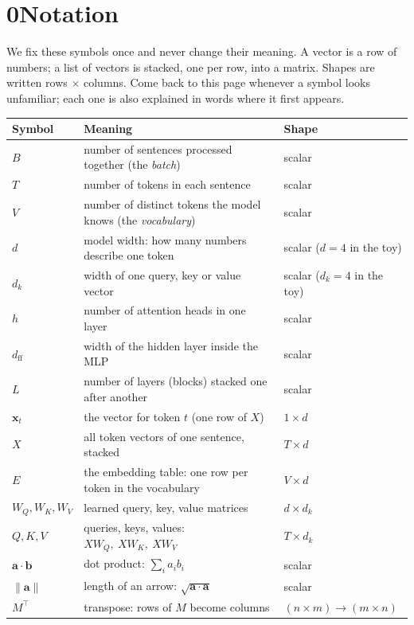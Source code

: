 \section*{0\quad Notation}

We fix these symbols once and never change their meaning. A vector is a row of numbers; a list of
vectors is stacked, one per row, into a matrix. Shapes are written rows $\times$ columns. Come back to this
page whenever a symbol looks unfamiliar; each one is also explained in words where it first appears.

\begin{center}
\small
\begin{longtable}{@{}l P{8.6cm} l@{}}
\toprule
Symbol & Meaning & Shape\\
\midrule
\endhead
$B$ & number of sentences processed together (the \emph{batch}) & scalar\\
$T$ & number of tokens in each sentence & scalar\\
$V$ & number of distinct tokens the model knows (the \emph{vocabulary}) & scalar\\
$d$ & model width: how many numbers describe one token & scalar ($d=4$ in the toy)\\
$d_k$ & width of one query, key or value vector & scalar ($d_k=4$ in the toy)\\
$h$ & number of attention heads in one layer & scalar\\
$d_{\mathrm{ff}}$ & width of the hidden layer inside the MLP & scalar\\
$L$ & number of layers (blocks) stacked one after another & scalar\\
$\bm{x}_t$ & the vector for token $t$ (one row of $X$) & $1\times d$\\
$X$ & all token vectors of one sentence, stacked & $T\times d$\\
$E$ & the embedding table: one row per token in the vocabulary & $V\times d$\\
$W_Q, W_K, W_V$ & learned query, key, value matrices & $d\times d_k$\\
$Q, K, V$ & queries, keys, values: $XW_Q,\ XW_K,\ XW_V$ & $T\times d_k$\\
$\bm{a}\cdot\bm{b}$ & dot product: $\sum_i a_i b_i$ & scalar\\
$\lVert\bm{a}\rVert$ & length of an arrow: $\sqrt{\bm{a}\cdot\bm{a}}$ & scalar\\
$M^\top$ & transpose: rows of $M$ become columns & $(n\times m)\to(m\times n)$\\

\end{longtable}
\end{center}
